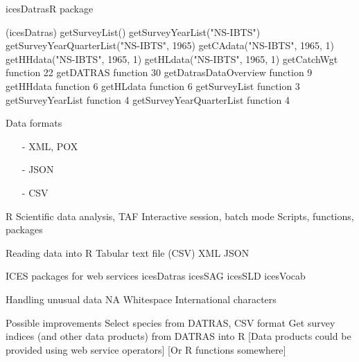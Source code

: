 \documentclass[aspectratio=169]{beamer}
\renewcommand\r[1]{\textblue{#1}}
\begin{document}

\begin{frame}[fragile]{icesDatras}{R package}
\begin{semiverbatim}
\r{library}(icesDatras)
getSurveyList()
getSurveyYearList("NS-IBTS")
getSurveyYearQuarterList("NS-IBTS", 1965)
getCAdata("NS-IBTS", 1965, 1)
getHHdata("NS-IBTS", 1965, 1)
getHLdata("NS-IBTS", 1965, 1)
getCatchWgt              function 22
getDATRAS                function 30
getDatrasDataOverview    function  9
getHHdata                function  6
getHLdata                function  6
getSurveyList            function  3
getSurveyYearList        function  4
getSurveyYearQuarterList function  4
\end{semiverbatim}
\end{frame}


\begin{frame}{Data formats}
  \begin{itemize}
    \item[-] XML, POX
    \item[-] JSON
    \item[-] CSV
  \end{itemize}
\end{frame}


\begin{frame}{R}
  Scientific data analysis, TAF
  Interactive session, batch mode
  Scripts, functions, packages
\end{frame}


\begin{frame}{Reading data into R}
  Tabular text file (CSV)
  XML
  JSON
\end{frame}


\begin{frame}{ICES packages for web services}
  icesDatras
  icesSAG
  icesSLD
  icesVocab
\end{frame}


\begin{frame}{Handling unusual data}
  NA
  Whitespace
  International characters
\end{frame}


\begin{frame}{Possible improvements}
  Select species from DATRAS, CSV format
  Get survey indices (and other data products) from DATRAS into R
  [Data products could be provided using web service operators]
  [Or R functions somewhere]
\end{frame}
\end{document}
